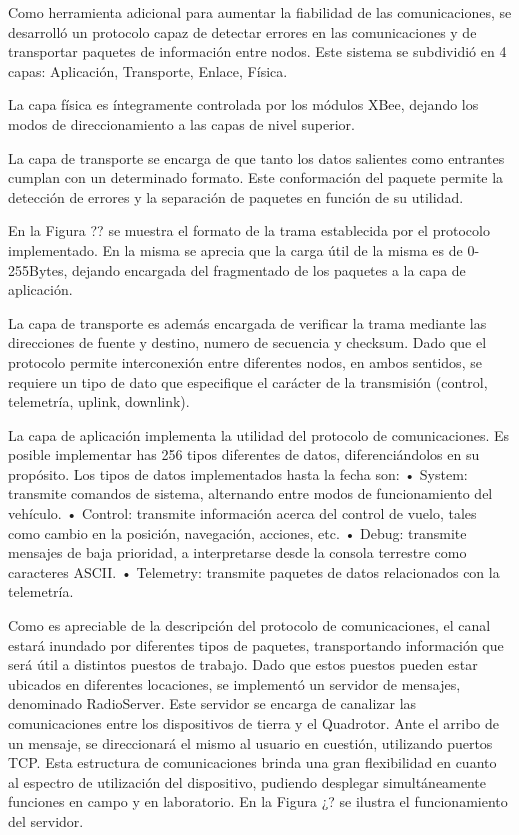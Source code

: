 \documentclass[a4paper, conference]{IEEEtran}
\begin{document}
Como herramienta adicional para aumentar la fiabilidad de las comunicaciones, se desarrolló un protocolo capaz de detectar errores en las comunicaciones y de transportar paquetes de información entre nodos. Este sistema se subdividió en 4 capas: Aplicación, Transporte, Enlace, Física.

La capa física es íntegramente controlada por los módulos XBee, dejando los modos de direccionamiento a las capas de nivel superior.

La capa de transporte se encarga de que tanto los datos salientes como entrantes cumplan con un determinado formato. Este conformación del paquete permite la detección de errores y la separación de paquetes en función de su utilidad.

En la Figura ?? se muestra el formato de la trama establecida por el protocolo implementado. En la misma se aprecia que la carga útil de la misma es de 0-255Bytes, dejando encargada del fragmentado de los paquetes a la capa de aplicación.
 
La capa de transporte es además encargada de verificar la trama mediante las direcciones de fuente y destino, numero de secuencia y checksum. Dado que el protocolo permite interconexión entre diferentes nodos, en ambos sentidos, se requiere un tipo de dato que especifique el carácter de la transmisión (control, telemetría, uplink, downlink).

La capa de aplicación implementa la utilidad del protocolo de comunicaciones. Es posible implementar has 256 tipos diferentes de datos, diferenciándolos en su propósito. Los tipos de datos implementados hasta la fecha son:
•	System: transmite comandos de sistema, alternando entre modos de funcionamiento del vehículo.
•	Control: transmite información acerca del control de vuelo, tales como cambio en la posición, navegación, acciones, etc.
•	Debug: transmite mensajes de baja prioridad, a interpretarse desde la consola terrestre como caracteres ASCII.
•	Telemetry: transmite paquetes de datos relacionados con la telemetría.

Como es apreciable de la descripción del protocolo de comunicaciones, el canal estará inundado por diferentes tipos de paquetes, transportando información que será útil a distintos puestos de trabajo. Dado que estos puestos pueden estar ubicados en diferentes locaciones, se implementó un servidor de mensajes, denominado RadioServer. Este servidor se encarga de canalizar las comunicaciones entre los dispositivos de tierra y el Quadrotor. Ante el arribo de un mensaje, se direccionará el mismo al usuario en cuestión, utilizando puertos TCP. Esta estructura de comunicaciones brinda una gran flexibilidad en cuanto al espectro de utilización del dispositivo, pudiendo desplegar simultáneamente funciones en campo y en laboratorio.
En la Figura ¿? se ilustra el funcionamiento del servidor.
 
\end{document}
